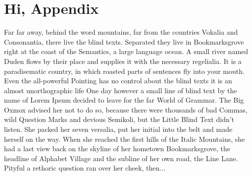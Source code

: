 \chapter{Hi, Appendix}
\label{ap:blind_text}

Far far away, behind the word mountains, far from the countries Vokalia and
Consonantia, there live the blind texts. Separated they live in
Bookmarksgrove right at the coast of the Semantics, a large language
ocean. A small river named Duden flows by their place and supplies it with
the necessary regelialia. It is a paradisematic country, in which roasted
parts of sentences fly into your mouth. Even the all-powerful Pointing has
no control about the blind texts it is an almost unorthographic life One
day however a small line of blind text by the name of Lorem Ipsum decided
to leave for the far World of Grammar. The Big Oxmox advised her not to do
so, because there were thousands of bad Commas, wild Question Marks and
devious Semikoli, but the Little Blind Text didn't listen. She packed her
seven versalia, put her initial into the belt and made herself on the
way. When she reached the first hills of the Italic Mountains, she had a
last view back on the skyline of her hometown Bookmarksgrove, the headline
of Alphabet Village and the subline of her own road, the Line Lane. Pityful
a rethoric question ran over her cheek, then... 